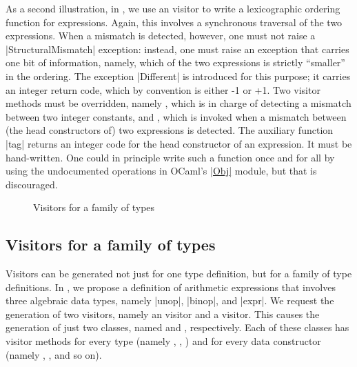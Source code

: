 \documentclass[11pt,a4paper,twoside]{article}
\begin{document}
As a second illustration, in , we use an \itertwo
visitor to write a lexicographic ordering function for expressions. Again,
this involves a synchronous traversal of the two expressions. When a mismatch
is detected, however, one must not raise a \oc|StructuralMismatch| exception:
instead, one must raise an exception that carries one bit of information,
namely, which of the two expressions is strictly ``smaller'' in the ordering.
The exception \oc|Different| is introduced for this purpose; it carries an
integer return code, which by convention is either -1 or +1. Two visitor methods
must be overridden, namely , which is in charge of detecting
a mismatch between two integer constants, and , which is invoked
when a mismatch between (the head constructors of) two expressions is detected.
The auxiliary function \oc|tag| returns an integer code for the head constructor
of an expression. It must be hand-written. One could in principle write such a
function once and for all by using the undocumented operations in OCaml's
\href{https://caml.inria.fr/pub/docs/manual-ocaml/libref/Obj.html}{\oc|Obj|}
module, but that is discouraged.



\begin{figure}[t]
\caption{Visitors for a family of types}
\label{fig:expr06}
\end{figure}

\subsection{Visitors for a family of types}
\label{sec:intro:family}

Visitors can be generated not just for one type definition, but for a family
of type definitions. In , we propose a definition of
arithmetic expressions that involves three algebraic data types, namely
\oc|unop|, \oc|binop|, and \oc|expr|. We request the generation of two
visitors, namely an \iter visitor and a \map visitor. This causes the
generation of just two classes, named \iter and \map, respectively. Each of
these classes has visitor methods for every type (namely ,
, ) and for every data constructor
(namely , , and so on).
\end{document}
